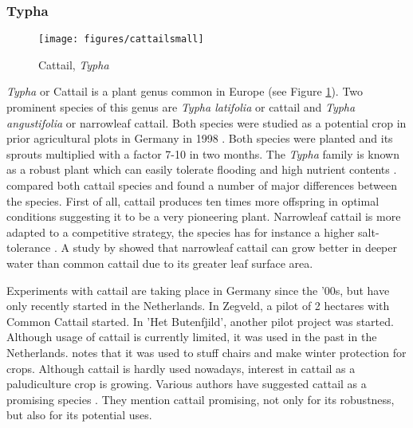 \documentclass[12pt,a4paper,titlepage]{article}
\begin{document}

\subsubsection{Typha}

\begin{figure}
    \centering
    \texttt{[image: figures/cattailsmall]} 
    \caption{Cattail, \textit{Typha}}
    \label{fig:cattail}
\end{figure}


\textit{Typha} or Cattail is a plant genus common in Europe (see Figure \ref{fig:cattail}). Two prominent species of this genus are \textit{Typha latifolia} or cattail and \textit{Typha angustifolia} or narrowleaf cattail. Both species were studied as a potential crop in prior agricultural plots in Germany in 1998 \citep{wild2001cultivation}. Both species were planted and its sprouts multiplied with a factor 7-10 in two months. The \textit{Typha} family is known as a robust plant which can easily tolerate flooding and high nutrient contents \citep{wild2001cultivation}. \citet{heinz2011population} compared both cattail species and found a number of major differences between the species. First of all, cattail produces ten times more offspring in optimal conditions suggesting it to be a very pioneering plant. Narrowleaf cattail is more adapted to a competitive strategy, the species has for instance a higher salt-tolerance \citep{heinz2011population}. A study by \citet{grace1982niche} showed that narrowleaf cattail can grow better in deeper water than common cattail due to its greater leaf surface area.

Experiments with cattail are taking place in Germany since the '00s, but have only recently started in the Netherlands. In Zegveld, a pilot of 2 hectares with Common Cattail started. In 'Het Butenfjild', another pilot project was started. Although usage of cattail is currently limited, it was used in the past in the Netherlands. \citet{morton1975cattails} notes that it was used to stuff chairs and make winter protection for crops. Although cattail is hardly used nowadays, interest in cattail as a paludiculture crop is growing. Various authors have suggested cattail as a promising species \citep{morton1975cattails, heinz2011population}. They mention cattail promising, not only for its robustness, but also for its potential uses. 
\end{document}
